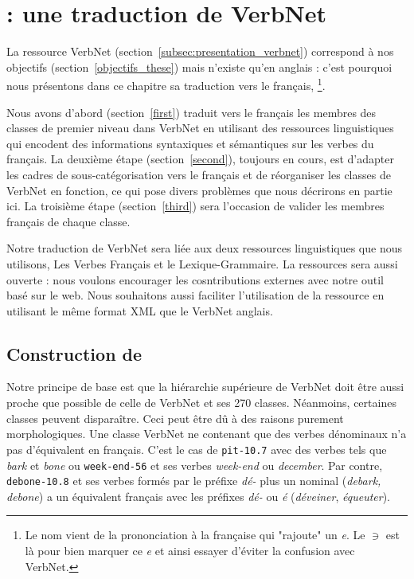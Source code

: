 \chapter{\verbenet{} : une traduction de VerbNet}
\label{ch:verbnet}

La ressource VerbNet (section~\ref{subsec:presentation_verbnet}) correspond à
nos objectifs (section~\ref{objectifs_these}) mais n'existe qu'en anglais :
c'est pourquoi nous présentons dans ce chapitre sa traduction vers le français,
\verbenet{}\footnote{Le nom vient de la prononciation à la française qui
"rajoute" un \emph{e}. Le $\ni$ est là pour bien marquer ce \emph{e} et
ainsi essayer d'éviter la confusion avec VerbNet.}.

Nous avons d'abord (section~\ref{first}) traduit vers le français les membres
des classes de premier niveau dans VerbNet en utilisant des ressources
linguistiques qui encodent des informations syntaxiques et sémantiques sur les
verbes du français. La deuxième étape (section~\ref{second}), toujours en
cours, est d'adapter les cadres de sous-catégorisation vers le français et de
réorganiser les classes de VerbNet en fonction, ce qui pose divers problèmes
que nous décrirons en partie ici. La troisième étape (section~\ref{third}) sera
l'occasion de valider les membres français de chaque classe.

Notre traduction de VerbNet sera liée aux deux ressources linguistiques que
nous utilisons, Les Verbes Français et le Lexique-Grammaire. La ressources sera
aussi ouverte : nous voulons encourager les cosntributions externes avec notre
outil basé sur le web. Nous souhaitons aussi faciliter l'utilisation de la
ressource en utilisant le même format XML que le VerbNet anglais.

\section{Construction de \verbenet{}}

Notre principe de base est que la hiérarchie supérieure de VerbNet doit être
aussi proche que possible de celle de VerbNet et ses 270 classes. Néanmoins,
certaines classes peuvent disparaître. Ceci peut être dû à des raisons purement
morphologiques. Une classe VerbNet ne contenant que des verbes dénominaux n'a
pas d'équivalent en français. C'est le cas de \texttt{pit-10.7} avec des verbes
tels que \emph{bark} et \emph{bone} ou \texttt{week-end-56} et ses verbes
\emph{week-end} ou \emph{december}. Par contre, \texttt{debone-10.8} et ses
verbes formés par le préfixe \emph{dé-} plus un nominal (\emph{debark, debone})
a un équivalent français avec les préfixes \emph{dé-} ou \emph{é}
(\emph{déveiner}, \emph{équeuter}).

